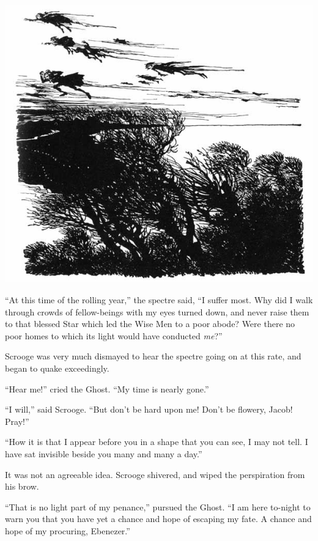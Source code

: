 \documentclass[paper=5.5in:8.5in,BCOR=5mm,twoside,DIV=calc,12pt,usegeometry]{scrbook} %
\begin{document}
\begin{center}
     \vfill%
     \includegraphics[width=\columnwidth]{gs045b}
 \end{center}
\afterpage{\clearpage}

\enquote{At this time of the rolling year,} the spectre said, \enquote{I suffer most. Why did I walk through crowds of fellow-beings with my eyes turned down, and never raise them to that blessed Star which led the Wise Men to a poor abode? Were there no poor homes to which its light would have conducted \textit{me}?}

Scrooge was very much dismayed to hear the spectre going on at this rate, and began to quake exceedingly.

\enquote{Hear me!} cried the Ghost. \enquote{My time is nearly gone.}




\enquote{I will,} said Scrooge. \enquote{But don't be hard upon me! Don't be flowery, Jacob! Pray!}

\enquote{How it is that I appear before you in a shape that you can see, I may not tell. I have sat invisible beside you many and many a day.}

It was not an agreeable idea. Scrooge shivered, and wiped the perspiration from his brow.

\enquote{That is no light part of my penance,} pursued the Ghost. \enquote{I am here to-night to warn you that you have yet a chance and hope of escaping my fate. A chance and hope of my procuring, Ebenezer.}
\end{document}
